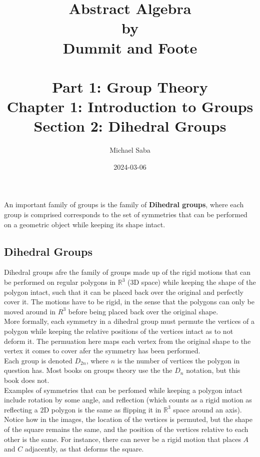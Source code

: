 \documentclass[12pt]{article}
\title{%
    \Huge Abstract Algebra \\
    \large by \\
    \Large Dummit and Foote \\~\\
    \huge Part 1: Group Theory \\
    \LARGE Chapter 1: Introduction to Groups \\
    \Large Section 2: Dihedral Groups
}
\date{2024-03-06}
\author{Michael Saba}
\newcommand{\R}{\mathbb{R}}
\begin{document}
    \maketitle
    \newpage


    An important family of groups
    is the family of \textbf{Dihedral groups},
    where each group is comprised corresponds to the set of symmetries 
    that can be performed on a geometric object
    while keeping its shape intact. \\

    \subsection*{Dihedral Groups}

    Dihedral groups afre the family of groups
    made up of the rigid motions that can be performed on regular polygons
    in $\R^3$ ($3$D space)
    while keeping the shape of the polygon intact,
    such that it can be placed back over the original
    and perfectly cover it.
    The motions have to be rigid,
    in the sense that the polygons can only be moved around in $R^3$
    before being placed back over the original shape. \\
    More formally,
    each symmetry in a dihedral group must permute the vertices of a polygon
    while keeping the relative positions of the vertices intact as to
    not deform it.
    The permuation here maps each vertex from the original shape
    to the vertex it comes to cover afer the symmetry has been performed. \\

    Each group is denoted $D_{2n}$,
    where $n$ is the number of vertices the polygon in question has.
    Most books on groups theory use the the $D_n$ notation,
    but this book does not. \\

    Examples of symmetries that can be perfomed
    while keeping a polygon intact include rotation by some angle,
    and reflection
    (which counts as a rigid motion as reflecting a $2$D polygon
    is the same as flipping it in $\R^3$ space around an axis). \\ 
    Notice how in the images,
    the location of the vertices is permuted,
    but the shape of the square remains the same,
    and the position of the vertices relative to each other is the same.
    For instance, there can never be a rigid motion that places
    $A$ and $C$ adjacently,
    as that deforms the square. \\
\end{document}
